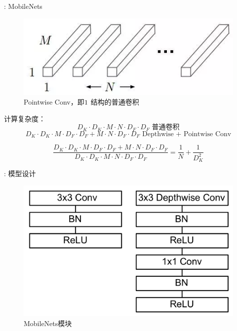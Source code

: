 \documentclass[UTF8, fontset=founder, aspectratio=43, 10pt, t]{ctexbeamer}
\begin{document}
\begin{frame}{\titleprefix: MobileNets}
	\begin{figure}
		\centering
		\includegraphics[width=0.5\linewidth]{Images/pointwise_1}
		\caption{Pointwise Conv，即$1\time 1$ 结构的普通卷积}
		\label{fig:pointwise1}
	\end{figure}
	
	计算复杂度：
	\[
	D_{K} \cdot D_{K} \cdot M \cdot N \cdot D_{F} \cdot D_{F} 
	\text{ 普通卷积}
	\]	
	\[
	D_{K} \cdot D_{K} \cdot M \cdot D_{F} \cdot D_{F}+M \cdot N \cdot D_{F} \cdot D_{F} 
	\text{ Depthwise + Pointwise Conv}
	\]
	
	\[
	\frac{D_{K} \cdot D_{K} \cdot M \cdot D_{F} \cdot D_{F}+M \cdot N \cdot D_{F} \cdot D_{F}}{D_{K} \cdot D_{K} \cdot M \cdot N \cdot D_{F} \cdot D_{F}} = \frac{1}{N}+\frac{1}{D_{K}^{2}} 
	\]
\end{frame}

\begin{frame}{\titleprefix: 模型设计}
	\begin{figure}
		\centering
		\includegraphics[width=0.7\linewidth]{Images/mobilenetblock}
		\caption{MobileNets模块}
		\label{fig:mobilenetblock}
	\end{figure}

\end{frame}
\end{document}
